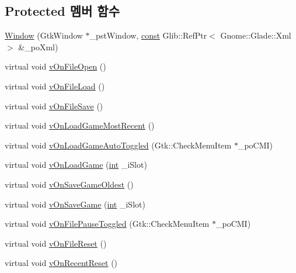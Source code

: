 \subsection*{Protected 멤버 함수}
\begin{DoxyCompactItemize}
\item 
\mbox{\hyperlink{class_v_b_a_1_1_window_a747763400ba237d06f6e01577998f6ab}{Window}} (Gtk\+Window $\ast$\+\_\+pst\+Window, \mbox{\hyperlink{getopt1_8c_a2c212835823e3c54a8ab6d95c652660e}{const}} Glib\+::\+Ref\+Ptr$<$ Gnome\+::\+Glade\+::\+Xml $>$ \&\+\_\+po\+Xml)
\item 
virtual void \mbox{\hyperlink{class_v_b_a_1_1_window_a8495a133642f2f0428d9487c86c8a231}{v\+On\+File\+Open}} ()
\item 
virtual void \mbox{\hyperlink{class_v_b_a_1_1_window_a74bd51bc1e0e699d5523ad7828031394}{v\+On\+File\+Load}} ()
\item 
virtual void \mbox{\hyperlink{class_v_b_a_1_1_window_a27bb0ed15cc90758c95eb11fddd14a86}{v\+On\+File\+Save}} ()
\item 
virtual void \mbox{\hyperlink{class_v_b_a_1_1_window_ac73a836767434700186832ae1ea49cc5}{v\+On\+Load\+Game\+Most\+Recent}} ()
\item 
virtual void \mbox{\hyperlink{class_v_b_a_1_1_window_a9457e3b8fe1022c96a548e1169002f0c}{v\+On\+Load\+Game\+Auto\+Toggled}} (Gtk\+::\+Check\+Menu\+Item $\ast$\+\_\+po\+C\+MI)
\item 
virtual void \mbox{\hyperlink{class_v_b_a_1_1_window_a18461a94955930d3e10fdb093322d7a9}{v\+On\+Load\+Game}} (\mbox{\hyperlink{_util_8cpp_a0ef32aa8672df19503a49fab2d0c8071}{int}} \+\_\+i\+Slot)
\item 
virtual void \mbox{\hyperlink{class_v_b_a_1_1_window_ac582c9416136eaaf39469fc9eff83fee}{v\+On\+Save\+Game\+Oldest}} ()
\item 
virtual void \mbox{\hyperlink{class_v_b_a_1_1_window_aa614f13101a25febb6f3c3805c947e3e}{v\+On\+Save\+Game}} (\mbox{\hyperlink{_util_8cpp_a0ef32aa8672df19503a49fab2d0c8071}{int}} \+\_\+i\+Slot)
\item 
virtual void \mbox{\hyperlink{class_v_b_a_1_1_window_a8cfc0cc364908602c3881304be30dfe4}{v\+On\+File\+Pause\+Toggled}} (Gtk\+::\+Check\+Menu\+Item $\ast$\+\_\+po\+C\+MI)
\item 
virtual void \mbox{\hyperlink{class_v_b_a_1_1_window_acd364daa2b85fc1c6b34d096305d8b48}{v\+On\+File\+Reset}} ()
\item 
virtual void \mbox{\hyperlink{class_v_b_a_1_1_window_a8f8de1653cccaa5c61312c68f4a037fe}{v\+On\+Recent\+Reset}} ()

\end{DoxyCompactItemize}
